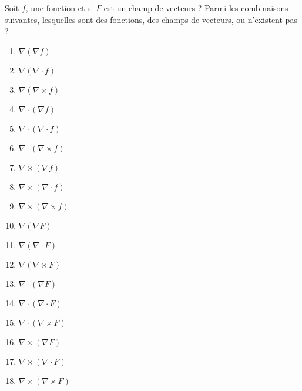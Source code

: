 
\begin{exercice}\label{exoOutilsMath-0035}

    Soit $f$, une fonction et si $F$ est un champ de vecteurs ? Parmi les combinaisons suivantes, lesquelles sont des fonctions, des champs de vecteurs, ou n'existent pas ?
    \begin{multicols}{3}
        \begin{enumerate}
            \item
                $\nabla(\nabla f)$
            \item
                $\nabla(\nabla\cdot f)$
            \item
                $\nabla(\nabla\times f)$
            \item
                $\nabla\cdot(\nabla f)$
            \item
                $\nabla\cdot(\nabla\cdot f)$
            \item
                $\nabla\cdot(\nabla\times f)$
            \item
                $\nabla\times(\nabla f)$
            \item
                $\nabla\times(\nabla\cdot f)$
            \item
                $\nabla\times(\nabla\times f)$
                
            \item
                $\nabla(\nabla F)$
            \item
                $\nabla(\nabla\cdot F)$
            \item
                $\nabla(\nabla\times F)$
            \item
                $\nabla\cdot(\nabla F)$
            \item
                $\nabla\cdot(\nabla\cdot F)$
            \item
                $\nabla\cdot(\nabla\times F)$
            \item
                $\nabla\times(\nabla F)$
            \item
                $\nabla\times(\nabla\cdot F)$
            \item
                $\nabla\times(\nabla\times F)$
                
        \end{enumerate}
    \end{multicols}

\end{exercice}
